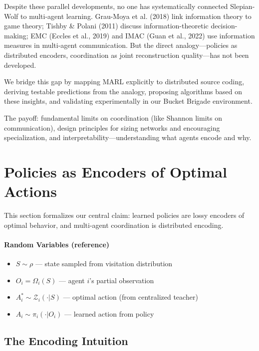 \documentclass[10pt, letterpaper]{article}
\begin{document}
Despite these parallel developments, no one has systematically connected Slepian-Wolf to multi-agent learning. Grau-Moya et al. (2018) link information theory to game theory; Tishby \& Polani (2011) discuss information-theoretic decision-making; EMC (Eccles et al., 2019) and IMAC (Guan et al., 2022) use information measures in multi-agent communication. But the direct analogy---policies as distributed encoders, coordination as joint reconstruction quality---has not been developed.

We bridge this gap by mapping MARL explicitly to distributed source coding, deriving testable predictions from the analogy, proposing algorithms based on these insights, and validating experimentally in our Bucket Brigade environment.

The payoff: fundamental limits on coordination (like Shannon limits on communication), design principles for sizing networks and encouraging specialization, and interpretability---understanding what agents encode and why.

\section{Policies as Encoders of Optimal Actions}
\label{sec:policies-as-encoders}

This section formalizes our central claim: learned policies are lossy encoders of optimal behavior, and multi-agent coordination is distributed encoding.

\paragraph{Random Variables (reference)}
\begin{itemize}
    \item $S \sim \rho$ --- state sampled from visitation distribution
    \item $O_i = \Omega_i(S)$ --- agent $i$'s partial observation
    \item $A_i^* \sim \mathcal{Z}_i(\cdot|S)$ --- optimal action (from centralized teacher)
    \item $A_i \sim \pi_i(\cdot|O_i)$ --- learned action from policy
\end{itemize}

\subsection{The Encoding Intuition}
\end{document}

